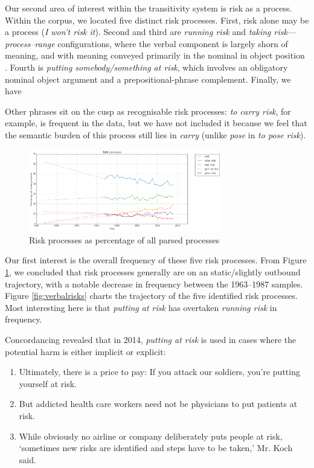 		Our second area of interest within the transitivity system is risk as a process. Within the corpus, we located five distinct risk processes. First, risk alone may be a process (\emph{I won't risk it}). Second and third are \emph{running risk} and \emph{taking risk}---\emph{process--range} configurations, where the verbal component is largely shorn of meaning, and with meaning conveyed primarily in the nominal in object position \cite{halliday_introduction_2004}. Fourth is \emph{putting somebody/something at risk}, which involves an obligatory nominal object argument and a prepositional-phrase complement. Finally, we have

        Other phrases sit on the cusp as recognisable risk processes: \emph{to carry risk}, for example, is frequent in the data, but we have not included it because we feel that the semantic burden of this process still lies in \emph{carry} (unlike \emph{pose} in \emph{to pose risk}).

			\begin{figure}[htb!]
			\centering
			\includegraphics[width=0.75\textwidth]{../images/risk_processes.png}
			\caption{Risk processes as percentage of all parsed processes}
			\label{fig:riskprocesses}
			\end{figure}
			Our first interest is the overall frequency of these five risk processes. From Figure \ref{fig:riskprocesses}, we concluded that risk processes generally are on an static\slash slightly outbound trajectory, with a notable decrease in frequency between the 1963--1987 samples. Figure \ref{fig:verbalrisks} charts the trajectory of the five identified risk processes. Most interesting here is that \emph{putting at risk} has overtaken \emph{running risk} in frequency.

            Concordancing revealed that in 2014, \emph{putting at risk} is used in cases where the potential harm is either implicit or explicit:

            \begin{enumerate}  [before=\itshape,font=\normalfont] \setlength\itemsep{0em} \small
                \item Ultimately, there is a price to pay: If you attack our soldiers, you're putting yourself at risk.
                \item But addicted health care workers need not be physicians to put patients at risk.
                \item While obviously no airline or company deliberately puts people at risk, `sometimes new risks are identified and steps have to be taken,' Mr. Koch said.
            \end{enumerate}

